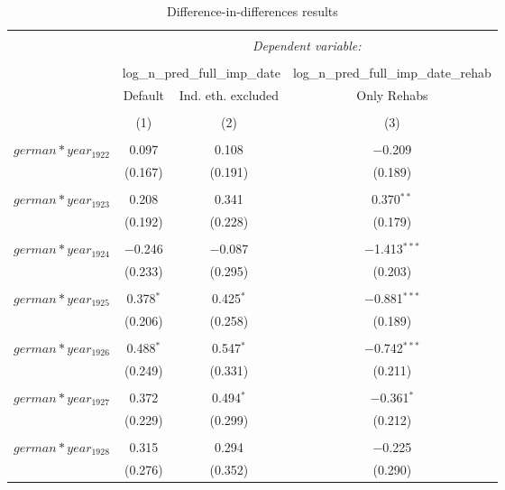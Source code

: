 
\begin{table}[!htbp] \centering 
  \caption{Difference-in-differences results} 
  \label{dif_table} 
\begin{tabular}{@{\extracolsep{5pt}}lccc} 
\\[-1.8ex]\hline 
\hline \\[-1.8ex] 
 & \multicolumn{3}{c}{\textit{Dependent variable:}} \\ 
\cline{2-4} 
\\[-1.8ex] & \multicolumn{2}{c}{log\_n\_pred\_full\_imp\_date} & log\_n\_pred\_full\_imp\_date\_rehab \\ 
 & Default & Ind. eth. excluded & Only Rehabs \\ 
\\[-1.8ex] & (1) & (2) & (3)\\ 
\hline \\[-1.8ex] 
 $german*year_1922$ & 0.097 & 0.108 & $-$0.209 \\ 
  & (0.167) & (0.191) & (0.189) \\ 
  & & & \\ 
 $german*year_1923$ & 0.208 & 0.341 & 0.370$^{**}$ \\ 
  & (0.192) & (0.228) & (0.179) \\ 
  & & & \\ 
 $german*year_1924$ & $-$0.246 & $-$0.087 & $-$1.413$^{***}$ \\ 
  & (0.233) & (0.295) & (0.203) \\ 
  & & & \\ 
 $german*year_1925$ & 0.378$^{*}$ & 0.425$^{*}$ & $-$0.881$^{***}$ \\ 
  & (0.206) & (0.258) & (0.189) \\ 
  & & & \\ 
 $german*year_1926$ & 0.488$^{*}$ & 0.547$^{*}$ & $-$0.742$^{***}$ \\ 
  & (0.249) & (0.331) & (0.211) \\ 
  & & & \\ 
 $german*year_1927$ & 0.372 & 0.494$^{*}$ & $-$0.361$^{*}$ \\ 
  & (0.229) & (0.299) & (0.212) \\ 
  & & & \\ 
 $german*year_1928$ & 0.315 & 0.294 & $-$0.225 \\ 
  & (0.276) & (0.352) & (0.290) \\ 

\end{tabular}
\end{table}
